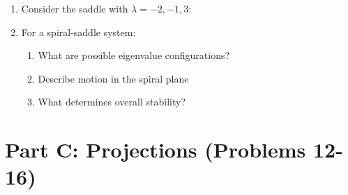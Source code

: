 \documentclass[12pt]{article}
\begin{document}
\begin{enumerate}[resume]
\item Consider the saddle with $\lambda = -2, -1, 3$:

\item For a spiral-saddle system:
\begin{enumerate}[label=(\alph*)]
    \item What are possible eigenvalue configurations?
    \item Describe motion in the spiral plane
    \item What determines overall stability?
\end{enumerate}
\end{enumerate}

\section*{Part C: Projections (Problems 12-16)}
\end{document}
